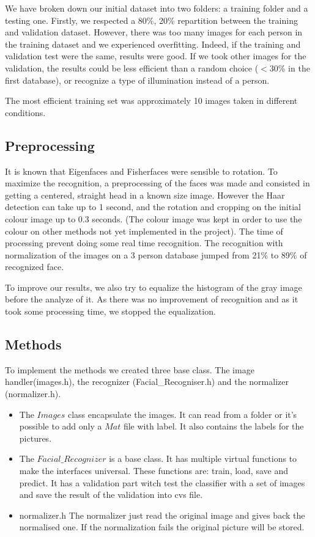 We have broken down our initial dataset into two folders: a training folder and a testing one. Firstly, we respected a 80\%, 20\% repartition between the training and validation dataset. However, there was too many images for each person in the training dataset and we experienced overfitting. Indeed, if the training and validation test were the same, results were good. If we took other images for the validation, the results could be less efficient than a random choice ($<$30\% in the first database), or recognize a type of illumination instead of a person.

The most efficient training set was approximately 10 images taken in different conditions. 

\subsection{Preprocessing}
It is known that Eigenfaces and Fisherfaces were sensible to rotation. To maximize the recognition, a preprocessing of the faces was made and consisted in getting a centered, straight head in a known size image. However the Haar detection can take up to 1 second, and the rotation and cropping on the initial colour image up to 0.3 seconds. (The colour image was kept in order to use the colour on other methods not yet implemented in the project). The time of processing prevent doing some real time recognition. The recognition with normalization of the images on a 3 person database jumped from 21\% to 89\% of recognized face.

To improve our results, we also try to equalize the histogram of the gray image before the analyze of it. As there was no improvement of recognition and as it took some processing time, we stopped the equalization.

\subsection{Methods}

To implement the methods we created three base class. The image handler(images.h), the recognizer (Facial\_Recogniser.h) and the normalizer (normalizer.h).
\begin{itemize}
	\item The $Images$ class encapsulate the images. It can read from a folder or it's possible to add only a $Mat$ file with label. It also contains the labels for the pictures.
	
	\item The $Facial\_Recognizer$ is a base class. It has multiple virtual functions to make the interfaces universal. These functions are: train, load, save and predict. It has a validation part witch test the classifier with a set of images and save the result of the validation into cvs file.
	
	\item normalizer.h
	The normalizer just read the original image and gives back the normalised one. If the normalization fails the original picture will be stored.
	
\end{itemize}


